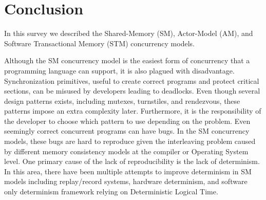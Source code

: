 \section{Conclusion\label{sec:conclusion}}
In this survey we described the Shared-Memory (SM),
Actor-Model (AM), and Software Transactional Memory (STM)
concurrency models.

Although the SM concurrency model is the
easiest form of concurrency that a programming language
can support, it is also plagued with disadvantage.
Synchronization primitives, useful to create
correct programs and protect critical sections, can be
misused by developers leading to deadlocks. Even though
several design patterns exists, including mutexes, turnstiles,
and rendezvous, these patterns impose an extra
complexity later. Furthermore, it is
the responsibility
of the developer to choose which pattern to use depending
on the problem. Even seemingly correct concurrent programs
can have bugs. In the SM concurrency models, these bugs
are hard to reproduce given the interleaving problem
caused by different memory consistency models at the compiler
or Operating System level. One primary cause of the lack
of reproducibility is the lack of determinism. In this area, there
have been multiple attempts to improve determinism in SM models
including replay/record systems, hardware determinism,
and software only determinism framework relying on 
Deterministic Logical Time.